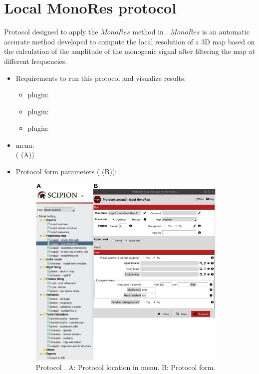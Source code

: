 \section{Local MonoRes protocol}
\label{app:localMonoRes}%

Protocol designed to apply the $MonoRes$ method \citep{vilas2018} in \scipion. $MonoRes$ is an automatic accurate method developed to compute the local resolution of a 3D map based on the calculation of the amplitude of the monogenic signal after filtering the map at different frequencies.

\begin{itemize}
 \item Requirements to run this protocol and visualize results:
    \begin{itemize}
        \item \scipion plugin: 
        \item \scipion plugin: 
        \item \scipion plugin: 
    \end{itemize}
 \item \scipion menu:\\
   ( (A))
  
 \item Protocol form parameters ( (B)):
  
    \begin{figure}[H]
     \centering 
     \captionsetup{width=.9\linewidth} 
     \includegraphics[width=0.90\textwidth]{Images_appendix/Fig207}
     \caption{Protocol . A: Protocol location in \scipion menu. B: Protocol form.}
     \label{fig:app_localMonoRes_1}
    \end{figure}
    

\end{itemize}
